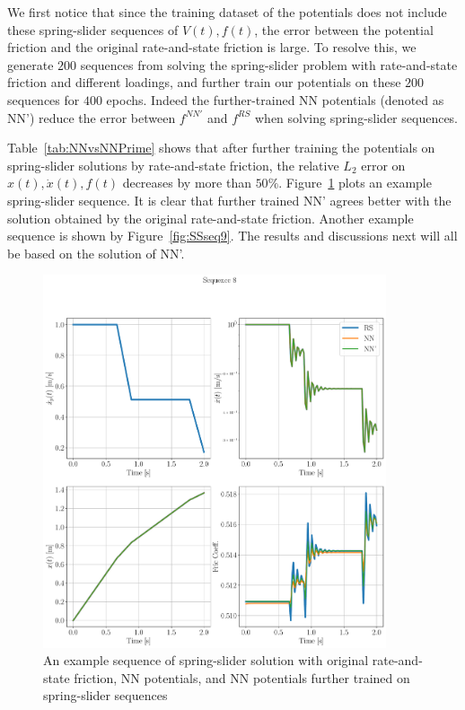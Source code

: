 We first notice that since the training dataset of the potentials does not include these spring-slider sequences of $V(t), f(t)$, 
the error between the potential friction and
the original rate-and-state friction is large. 
To resolve this, 
we generate $200$ sequences from solving the spring-slider problem with rate-and-state friction and different loadings, 
and further train our potentials on these $200$ sequences for $400$ epochs. 
Indeed the further-trained NN potentials (denoted as NN') reduce the error between $f^{NN'}$ and $f^{RS}$ when solving spring-slider sequences. 

Table~\ref{tab:NNvsNNPrime} shows that after further training the potentials on spring-slider solutions by rate-and-state friction, 
the relative $L_2$ error on $x(t), \dot{x}(t), f(t)$ decreases by more than $50\%$. 
Figure~\ref{fig:SSseq8} plots an example spring-slider sequence. 
It is clear that further trained NN' agrees better with the solution obtained by the original rate-and-state friction. 
Another example sequence is shown by Figure~\ref{fig:SSseq9}.
The results and discussions next will all be based on the solution of NN'. 

\begin{figure}[htbp]
    \centering
    \includegraphics[width=0.9\textwidth]{figures/SS_seq8_0216_0521SS_combined_800.pdf}
    \caption{An example sequence of spring-slider solution with original rate-and-state friction, 
    NN potentials, 
    and NN potentials further trained on spring-slider sequences}
    \label{fig:SSseq8}
\end{figure}

